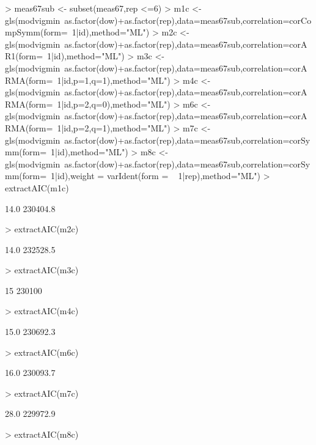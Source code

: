 \documentclass[11pt]{article}
\begin{document}
\begin{Schunk}
\begin{Sinput}
> meas67sub <- subset(meas67,rep <=6)
> m1c <- gls(modvigmin~as.factor(dow)+as.factor(rep),data=meas67sub,correlation=corCompSymm(form=~1|id),method="ML")
> m2c <- gls(modvigmin~as.factor(dow)+as.factor(rep),data=meas67sub,correlation=corAR1(form=~1|id),method="ML")
> m3c <- gls(modvigmin~as.factor(dow)+as.factor(rep),data=meas67sub,correlation=corARMA(form=~1|id,p=1,q=1),method="ML")
> m4c <- gls(modvigmin~as.factor(dow)+as.factor(rep),data=meas67sub,correlation=corARMA(form=~1|id,p=2,q=0),method="ML")
> m6c <- gls(modvigmin~as.factor(dow)+as.factor(rep),data=meas67sub,correlation=corARMA(form=~1|id,p=2,q=1),method="ML")
> m7c <- gls(modvigmin~as.factor(dow)+as.factor(rep),data=meas67sub,correlation=corSymm(form=~1|id),method="ML")
> m8c <- gls(modvigmin~as.factor(dow)+as.factor(rep),data=meas67sub,correlation=corSymm(form=~1|id),weight = varIdent(form = ~ 1|rep),method="ML")
> extractAIC(m1c)
\end{Sinput}
\begin{Soutput}
[1]     14.0 230404.8
\end{Soutput}
\begin{Sinput}
> extractAIC(m2c)
\end{Sinput}
\begin{Soutput}
[1]     14.0 232528.5
\end{Soutput}
\begin{Sinput}
> extractAIC(m3c)
\end{Sinput}
\begin{Soutput}
[1]     15 230100
\end{Soutput}
\begin{Sinput}
> extractAIC(m4c)
\end{Sinput}
\begin{Soutput}
[1]     15.0 230692.3
\end{Soutput}
\begin{Sinput}
> extractAIC(m6c)
\end{Sinput}
\begin{Soutput}
[1]     16.0 230093.7
\end{Soutput}
\begin{Sinput}
> extractAIC(m7c)
\end{Sinput}
\begin{Soutput}
[1]     28.0 229972.9
\end{Soutput}
\begin{Sinput}
> extractAIC(m8c)
\end{Sinput}

\end{Schunk}
\end{document}
